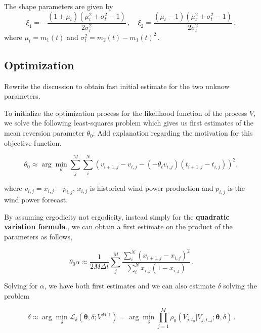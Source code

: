 \documentclass[11pt]{article}
\theoremstyle{definition}
\begin{document}
The shape parameters are given by
\begin{equation}
\xi_1 = - \frac{(1+\mu_t )(\mu_t^2 + \sigma_t^2 -1)}{2 \sigma_t^2}\,, \quad \xi_2=  \frac{(\mu_t-1 )(\mu_t^2 + \sigma_t^2 -1)}{2 \sigma_t^2} \,, \label{param_transformed_beta}
\end{equation}
where $\mu_t = m_1 (t)$ and $\sigma_t^2= m_2 (t)- m_1 (t)^2\,.$

\subsection{Optimization} \label{opt_sec}
{\color{red} Rewrite the discussion to obtain fast initial estimate for the two unknow parameters.}

To initialize the optimization process for the likelihood function of the process $V$, we solve the following least-squares problem which gives us first estimates of the mean reversion parameter $\theta_0$: {\color{red} Add explanation regarding the motivation for this objective function.}

\begin{equation}
\theta_0\approx\arg\min_{\theta} \sum\limits_{j}^M \sum\limits_i^N \left( v_{i+1,j}  - v_{i,j}- \left( - \theta_t v_{i,j}\right) \left(t_{i+1,j} - t_{i,j} \right)  \right)^2,
\label{inital_theta}
\end{equation}
 
 where $v_{i,j}=x_{i,j}-p_{i,j}$,  $x_{i,j}$ is historical wind power production and $p_{i,j}$ is the wind power forecast.
 
 By assuming ergodicity {\color{red} not ergodicity, instead simply for the \textbf{quadratic variation formula}.}, we can obtain a first estimate on the product of the parameters as follows,
 
\begin{equation}
\theta_0 \alpha \approx \frac{1}{2M\Delta t} \sum\limits_j^M \frac{ \sum\limits_i^N (x_{i+1,j}  - x_{i,j})^2}{ \sum\limits_i^N x_{i,j}(1-x_{i,j}) } \,.
\end{equation}

Solving for $\alpha$, we have both first estimates and we can also estimate $\delta$ solving the problem


\begin{equation}
\delta\approx\arg\min_{\delta}\mathcal{L}_{\delta}(\bm{\theta},\delta; V^{M,1}) = \arg\min_{\delta}\prod\limits_{j=1}^M \rho_0 (V_{j, t_0}|V_{j, t_{-\delta}};\bm{\theta},\delta) \,.
\label{likelihood_delta}
\end{equation}
\end{document}
